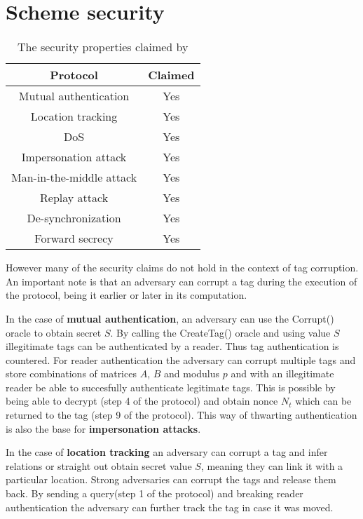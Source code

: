 \section{Scheme security}
\begin{table}[H]
    \centering
    \caption{The security properties claimed by \cite{BOM}}
    \begin{tabular}{| c | c |}
        \hline
        Protocol & Claimed \\
        \hline
        Mutual authentication & Yes \\
        Location tracking & Yes \\
        DoS & Yes \\
        Impersonation attack & Yes  \\
        Man-in-the-middle attack & Yes  \\
        Replay attack & Yes  \\
        De-synchronization & Yes  \\
        Forward secrecy & Yes \\
        \hline
    \end{tabular}
\end{table}

    However many of the security claims do not hold in the context of tag corruption. An important note is that an adversary can corrupt
    a tag during the execution of the protocol, being it earlier or later in its computation.

    In the case of \textbf{mutual authentication}, an adversary can use the Corrupt() oracle to obtain secret $S$. By calling the CreateTag()
    oracle and using value $S$ illegitimate tags can be authenticated by a reader. Thus tag authentication is countered.
    For reader authentication the adversary can corrupt
    multiple tags and store combinations of matrices $A$, $B$ and modulus $p$ and with an illegitimate reader be able to succesfully
    authenticate legitimate tags. This is possible by being able to decrypt (step 4 of the protocol) and obtain nonce $N_t$ which can
    be returned to the tag (step 9 of the protocol). This way of thwarting authentication is also the base for \textbf{impersonation attacks}.
    
    In the case of \textbf{location tracking} an adversary can corrupt a tag and infer relations or straight out obtain secret value $S$, meaning
    they can link it with a particular location. Strong adversaries can corrupt the tags and release them back. By sending a query(step 1
    of the protocol) and breaking reader authentication the adversary can further track the tag in case it was moved.

